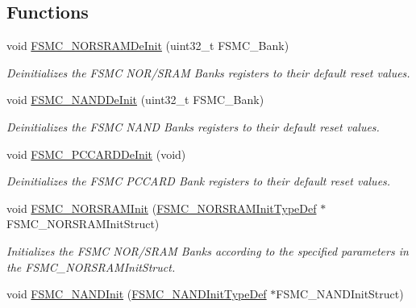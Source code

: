 \subsection*{Functions}
\begin{DoxyCompactItemize}
\item 
void \hyperlink{group___f_s_m_c___private___functions_gaab3e6648e8a584e73785361ac960eded}{F\+S\+M\+C\+\_\+\+N\+O\+R\+S\+R\+A\+M\+De\+Init} (uint32\+\_\+t F\+S\+M\+C\+\_\+\+Bank)
\begin{DoxyCompactList}\small\item\em Deinitializes the F\+S\+MC N\+O\+R/\+S\+R\+AM Banks registers to their default reset values. \end{DoxyCompactList}\item 
void \hyperlink{group___f_s_m_c___private___functions_gafb749503293474a68555961bd8f120e1}{F\+S\+M\+C\+\_\+\+N\+A\+N\+D\+De\+Init} (uint32\+\_\+t F\+S\+M\+C\+\_\+\+Bank)
\begin{DoxyCompactList}\small\item\em Deinitializes the F\+S\+MC N\+A\+ND Banks registers to their default reset values. \end{DoxyCompactList}\item 
void \hyperlink{group___f_s_m_c___private___functions_ga2f53ccf3a4f3c80a5a56fb47ccd47ccd}{F\+S\+M\+C\+\_\+\+P\+C\+C\+A\+R\+D\+De\+Init} (void)
\begin{DoxyCompactList}\small\item\em Deinitializes the F\+S\+MC P\+C\+C\+A\+RD Bank registers to their default reset values. \end{DoxyCompactList}\item 
void \hyperlink{group___f_s_m_c___private___functions_ga9c27816e8b17394c9ee1ce9298917b4a}{F\+S\+M\+C\+\_\+\+N\+O\+R\+S\+R\+A\+M\+Init} (\hyperlink{struct_f_s_m_c___n_o_r_s_r_a_m_init_type_def}{F\+S\+M\+C\+\_\+\+N\+O\+R\+S\+R\+A\+M\+Init\+Type\+Def} $\ast$F\+S\+M\+C\+\_\+\+N\+O\+R\+S\+R\+A\+M\+Init\+Struct)
\begin{DoxyCompactList}\small\item\em Initializes the F\+S\+MC N\+O\+R/\+S\+R\+AM Banks according to the specified parameters in the F\+S\+M\+C\+\_\+\+N\+O\+R\+S\+R\+A\+M\+Init\+Struct. \end{DoxyCompactList}\item 
void \hyperlink{group___f_s_m_c___private___functions_ga9f81ccc4e126c11f1eb33077b1a68e6f}{F\+S\+M\+C\+\_\+\+N\+A\+N\+D\+Init} (\hyperlink{struct_f_s_m_c___n_a_n_d_init_type_def}{F\+S\+M\+C\+\_\+\+N\+A\+N\+D\+Init\+Type\+Def} $\ast$F\+S\+M\+C\+\_\+\+N\+A\+N\+D\+Init\+Struct)

\end{DoxyCompactItemize}

